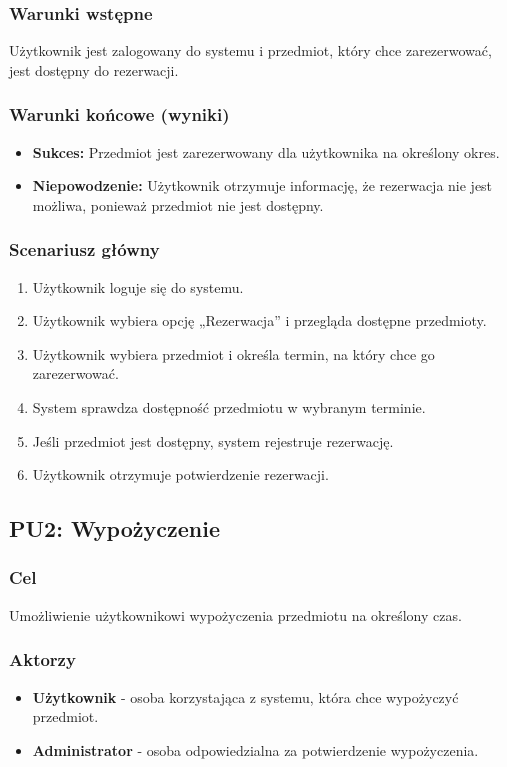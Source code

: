 \documentclass{article}
\begin{document}
\subsubsection{Warunki wstępne}
Użytkownik jest zalogowany do systemu i przedmiot, który chce zarezerwować, jest dostępny do rezerwacji.

\subsubsection{Warunki końcowe (wyniki)}
\begin{itemize}
    \item \textbf{Sukces:} Przedmiot jest zarezerwowany dla użytkownika na określony okres.
    \item \textbf{Niepowodzenie:} Użytkownik otrzymuje informację, że rezerwacja nie jest możliwa, ponieważ przedmiot nie jest dostępny.
\end{itemize}

\subsubsection{Scenariusz główny}
\begin{enumerate}
    \item Użytkownik loguje się do systemu.
    \item Użytkownik wybiera opcję „Rezerwacja” i przegląda dostępne przedmioty.
    \item Użytkownik wybiera przedmiot i określa termin, na który chce go zarezerwować.
    \item System sprawdza dostępność przedmiotu w wybranym terminie.
    \item Jeśli przedmiot jest dostępny, system rejestruje rezerwację.
    \item Użytkownik otrzymuje potwierdzenie rezerwacji.
\end{enumerate}

\subsection{PU2: Wypożyczenie}

\subsubsection{Cel}
Umożliwienie użytkownikowi wypożyczenia przedmiotu na określony czas.

\subsubsection{Aktorzy}
\begin{itemize}
    \item \textbf{Użytkownik} - osoba korzystająca z systemu, która chce wypożyczyć przedmiot.
    \item \textbf{Administrator} - osoba odpowiedzialna za potwierdzenie wypożyczenia.
\end{itemize}
\end{document}
